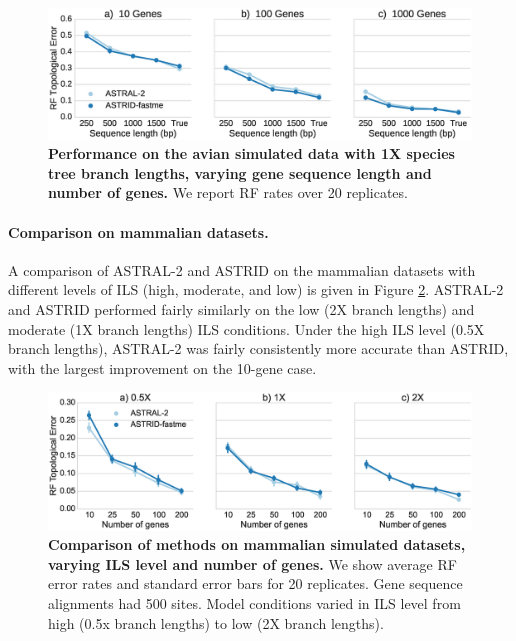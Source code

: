 \begin{figure}
  \centering
  \includegraphics[width=12cm]{astrid-figs/avian-seqlength-main.eps}
  \caption[Performance on the avian simulated data with 1X
      species tree branch lengths]{\textbf{Performance on the avian simulated data with 1X
      species tree branch lengths, varying gene sequence length and
      number of genes.} We report RF  rates over 20
    replicates.}
  \label{astrid::fig:avian-seqlength}
\end{figure}

\paragraph{Comparison on mammalian datasets. }
A comparison of ASTRAL-2 
 and ASTRID on the mammalian datasets
with different levels of ILS (high, moderate, and low)
is given in 
Figure \ref{astrid::fig:mammalian-ils}.
ASTRAL-2 
 and ASTRID performed
fairly similarly on the low (2X branch lengths) and moderate (1X branch
lengths) ILS conditions. Under the high ILS level (0.5X branch lengths), ASTRAL-2 
 was fairly consistently more accurate than ASTRID, with the largest
improvement on the 10-gene case.

\begin{figure}
  \centering
  \includegraphics[width=12cm]{astrid-figs/mammalian-ils.eps}
  \caption[Comparison of methods on mammalian simulated datasets, varying ILS level and number of genes]{\textbf{Comparison of methods on mammalian simulated datasets, varying ILS level and number of genes.}  We
show average RF error rates and standard error bars for 20 replicates. 
Gene sequence alignments had
    500 sites. Model conditions varied in ILS level
from high (0.5x branch lengths) to low (2X branch lengths).
}
  \label{astrid::fig:mammalian-ils}
\end{figure}

